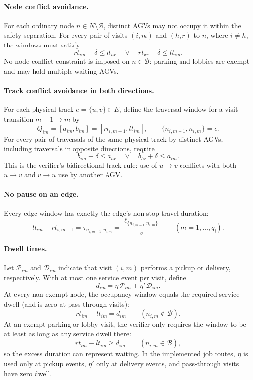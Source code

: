 \documentclass[11pt]{article}
\begin{document}
\paragraph{Node conflict avoidance.}
For each ordinary node $n\in N\setminus\mathcal{B}$, distinct AGVs may not
occupy it within the safety separation. For every pair of visits $(i,m)$ and
$(h,r)$ to $n$, where $i\ne h$, the windows must satisfy
\[
  rt_{im}+\delta\le lt_{hr}
  \quad\lor\quad
  rt_{hr}+\delta\le lt_{im}.
\]
No node-conflict constraint is imposed on $n\in\mathcal{B}$: parking and
lobbies are exempt and may hold multiple waiting AGVs.

\paragraph{Track conflict avoidance in both directions.}
For each physical track $e=\{u,v\}\in E$, define the traversal window for a
visit transition $m-1\to m$ by
\[
  Q_{im}=[a_{im},b_{im}]
  =[rt_{i,m-1},lt_{im}],
  \qquad \{n_{i,m-1},n_{i,m}\}=e.
\]
For every pair of traversals of the same physical track by distinct AGVs,
including traversals in opposite directions, require
\[
  b_{im}+\delta\le a_{hr}
  \quad\lor\quad
  b_{hr}+\delta\le a_{im}.
\]
This is the verifier's bidirectional-track rule: use of $u\to v$ conflicts
with both $u\to v$ and $v\to u$ use by another AGV.

\paragraph{No pause on an edge.}
Every edge window has exactly the edge's non-stop travel duration:
\[
  lt_{im}-rt_{i,m-1}
  =\tau_{n_{i,m-1},n_{i,m}}
  =\frac{\ell_{\{n_{i,m-1},n_{i,m}\}}}{v}
  \qquad (m=1,\ldots,q_i).
\]

\paragraph{Dwell times.}
Let $\mathcal{P}_{im}$ and $\mathcal{D}_{im}$ indicate that visit $(i,m)$
performs a pickup or delivery, respectively. With at most one service event
per visit, define
\[
  d_{im}=\eta\,\mathcal{P}_{im}+\eta'\,\mathcal{D}_{im}.
\]
At every non-exempt node, the occupancy window equals the required service
dwell (and is zero at pass-through visits):
\[
  rt_{im}-lt_{im}=d_{im}
  \qquad(n_{i,m}\notin\mathcal{B}).
\]
At an exempt parking or lobby visit, the verifier only requires the window to
be at least as long as any service dwell there:
\[
  rt_{im}-lt_{im}\ge d_{im}
  \qquad(n_{i,m}\in\mathcal{B}),
\]
so the excess duration can represent waiting. In the implemented job routes,
$\eta$ is used only at pickup events, $\eta'$ only at delivery events, and
pass-through visits have zero dwell.
\end{document}
